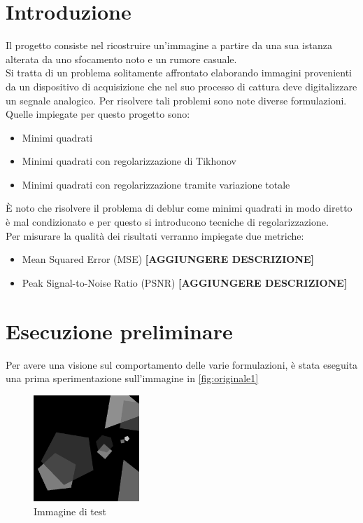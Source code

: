 \documentclass[11pt]{article}
\begin{document}
\section{Introduzione}
Il progetto consiste nel ricostruire un'immagine a partire da una sua istanza alterata da uno sfocamento noto e un rumore casuale.\\
Si tratta di un problema solitamente affrontato elaborando immagini provenienti da un dispositivo di acquisizione che nel suo processo di cattura deve digitalizzare un segnale analogico. 
Per risolvere tali problemi sono note diverse formulazioni. Quelle impiegate per questo progetto sono:
\begin{itemize}
    \setlength\itemsep{0.05cm}
    \item Minimi quadrati
    \item Minimi quadrati con regolarizzazione di Tikhonov
    \item Minimi quadrati con regolarizzazione tramite variazione totale
\end{itemize}
È noto che risolvere il problema di deblur come minimi quadrati in modo diretto è mal condizionato e per questo si introducono tecniche di regolarizzazione.\\
Per misurare la qualità dei risultati verranno impiegate due metriche:
\begin{itemize}
    \setlength\itemsep{0.05cm}
    \item Mean Squared Error (MSE) \textbf{[AGGIUNGERE DESCRIZIONE]}
    \item Peak Signal-to-Noise Ratio (PSNR) \textbf{[AGGIUNGERE DESCRIZIONE]}
\end{itemize}

\section{Esecuzione preliminare}
\label{chap:lambda}
Per avere una visione sul comportamento delle varie formulazioni, è stata eseguita una prima sperimentazione sull'immagine in \autoref{fig:originale1}
\begin{figure}[H]
    \centering
    \includegraphics[width=4cm]{esecuzione/originale.png}
    \caption{Immagine di test}
    \label{fig:originale1}
\end{figure}
\end{document}
